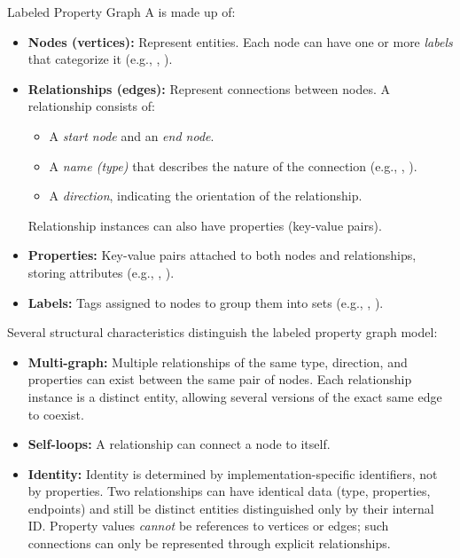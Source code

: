 \begin{definition}{Labeled Property Graph}
A  is made up of:
\begin{itemize}
    \item \textbf{Nodes (vertices):} Represent entities. Each node can have one or more \emph{labels} that categorize it (e.g., , ).
    \item \textbf{Relationships (edges):} Represent connections between nodes. A relationship consists of:
    \begin{itemize}
        \item A \emph{start node} and an \emph{end node}.
        \item A \emph{name (type)} that describes the nature of the connection (e.g., , ).
        \item A \emph{direction}, indicating the orientation of the relationship.
    \end{itemize}
    Relationship instances can also have properties (key-value pairs).
    \item \textbf{Properties:} Key-value pairs attached to both nodes and relationships, storing attributes (e.g., , ).
    \item \textbf{Labels:} Tags assigned to nodes to group them into sets (e.g., , ).
\end{itemize}
\end{definition}

Several structural characteristics distinguish the labeled property graph model:

\begin{itemize}
    \item \textbf{Multi-graph:} Multiple relationships of the same type, direction, and properties can exist between the same pair of nodes. Each relationship instance is a distinct entity, allowing several versions of the exact same edge to coexist.
    \item \textbf{Self-loops:} A relationship can connect a node to itself.
    \item \textbf{Identity:} Identity is determined by implementation-specific identifiers, not by properties. Two relationships can have identical data (type, properties, endpoints) and still be distinct entities distinguished only by their internal ID. Property values \emph{cannot} be references to vertices or edges; such connections can only be represented through explicit relationships.
\end{itemize}

